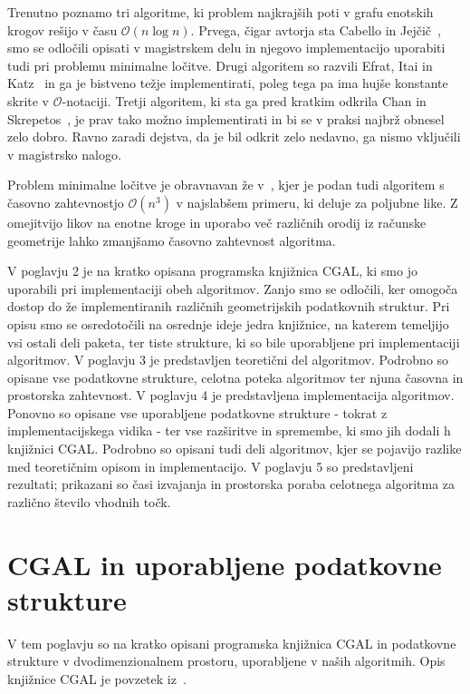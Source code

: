 \documentclass[a4paper, 12pt]{book}
\newcommand{\OO}{\ensuremath{\mathcal{O}}} %
\newcommand{\clearemptydoublepage}{\newpage{\pagestyle{empty}\cleardoublepage}}
\begin{document}
Trenutno poznamo tri algoritme, ki problem najkrajših poti v grafu enotskih krogov rešijo v času $\OO(n\log n)$. Prvega, čigar avtorja sta Cabello in Jejčič~\cite{CJ15}, smo se odločili opisati v magistrskem delu in njegovo implementacijo uporabiti tudi pri problemu minimalne ločitve.
Drugi algoritem so razvili Efrat, Itai in Katz~\cite{eik-01} in ga je bistveno težje implementirati, poleg tega pa ima hujše konstante skrite v \OO -notaciji.
Tretji algoritem, ki sta ga pred kratkim odkrila Chan in Skrepetos~\cite{ChanS16}, je prav tako možno implementirati in bi se v praksi najbrž obnesel zelo dobro. Ravno zaradi dejstva, da je bil odkrit zelo nedavno, ga nismo vključili v magistrsko nalogo.

Problem minimalne ločitve je obravnavan že v~\cite{CG16}, kjer je podan tudi algoritem s časovno zahtevnostjo $\OO(n^3)$ v najslabšem primeru, ki deluje za poljubne like. Z omejitvijo likov na enotne kroge in uporabo več različnih orodij iz računske geometrije lahko zmanjšamo časovno zahtevnost algoritma.

V poglavju 2 je na kratko opisana programska knjižnica CGAL, ki smo jo uporabili pri implementaciji obeh algoritmov. Zanjo smo se odločili, ker omogoča dostop do že implementiranih različnih geometrijskih podatkovnih struktur. Pri opisu smo se osredotočili na osrednje ideje jedra knjižnice, na katerem temeljijo vsi ostali deli paketa, ter tiste strukture, ki so bile uporabljene pri implementaciji algoritmov. V poglavju 3 je predstavljen teoretični del algoritmov. Podrobno so opisane vse podatkovne strukture, celotna poteka algoritmov ter njuna časovna in prostorska zahtevnost. V poglavju 4 je predstavljena implementacija algoritmov. Ponovno so opisane vse uporabljene podatkovne strukture - tokrat z implementacijskega vidika - ter vse razširitve in spremembe, ki smo jih dodali h knjižnici CGAL. Podrobno so opisani tudi deli algoritmov, kjer se pojavijo razlike med teoretičnim opisom in implementacijo. V poglavju 5 so predstavljeni rezultati; prikazani so časi izvajanja in prostorska poraba celotnega algoritma za različno število vhodnih točk.

\clearemptydoublepage


\chapter{CGAL in uporabljene podatkovne strukture}
\label{ch1}

V tem poglavju so na kratko opisani programska knjižnica CGAL in podatkovne strukture v dvodimenzionalnem prostoru, uporabljene v naših algoritmih. Opis knjižnice CGAL je povzetek iz~\cite{cgal:bfghhkps-lgk23-16b}.
\end{document}
